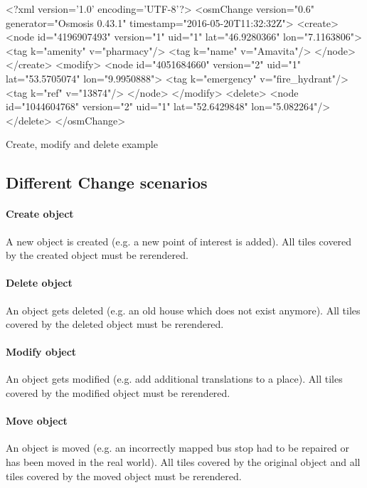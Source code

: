 \begin{listing}[H]
  \centering
  \begin{xmlcode}
<?xml version='1.0' encoding='UTF-8'?>
<osmChange version="0.6" generator="Osmosis 0.43.1" timestamp="2016-05-20T11:32:32Z">
  <create>
    <node id="4196907493" version="1" uid="1" lat="46.9280366" lon="7.1163806">
      <tag k="amenity" v="pharmacy"/>
      <tag k="name" v="Amavita"/>
    </node>
  </create>
  <modify>
    <node id="4051684660" version="2" uid="1" lat="53.5705074" lon="9.9950888">
      <tag k="emergency" v="fire_hydrant"/>
      <tag k="ref" v="13874"/>
    </node>
    </modify>
  <delete>
    <node id="1044604768" version="2" uid="1" lat="52.6429848" lon="5.082264"/>
  </delete>
</osmChange>
  \end{xmlcode}
  \caption{Create, modify and delete example}
  \label{create_modify_delete_xml}
\end{listing}

\subsection*{Different Change scenarios}\label{osm_change_scenarios}


\paragraph{Create object} A new object is created (e.g. a new point of interest is added). All tiles covered by the created object must be rerendered.

\paragraph{Delete object} An object gets deleted (e.g. an old house which does not exist anymore). All tiles covered by the deleted object must be rerendered.

\paragraph{Modify object} An object gets modified (e.g. add additional translations to a place). All tiles covered by the modified object must be rerendered.

\paragraph{Move object} An object is moved (e.g. an incorrectly mapped bus stop had to be repaired or has been moved in the real world). All tiles covered by the original object and all tiles covered by the moved object must be rerendered.

